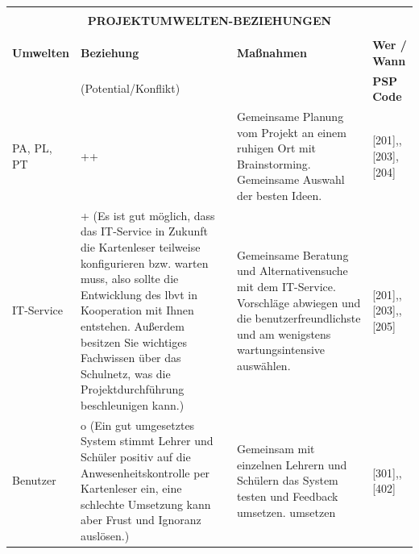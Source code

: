\begingroup
\begin{scriptsize}
\renewcommand*{\arraystretch}{1.1} %
\begin{center}
\begin{tabularx}{\textwidth}{|l|p{5.5cm}|X|p{1.8cm}|}
    \hline
    \multicolumn{4}{|c|}{\vspace{-0.005cm}\rowcolor{gray}} \\
    \multicolumn{4}{|c|}{\rowcolor{gray} \bfseries \color{white} \normalsize PROJEKTUMWELTEN-BEZIEHUNGEN \vspace{-0.05cm}} \\
    \multicolumn{4}{|c|}{\rowcolor{gray}} \\
    \hline
    \small \textbf{Umwelten} & \small \textbf{Beziehung} & \small \textbf{Maßnahmen} & \small \textbf{Wer / Wann} \\
    & \scriptsize{(Potential/Konflikt)} & & \scriptsize{\textbf{PSP Code}}\\
    \hline
    PA, PL, PT & ++ & Gemeinsame Planung vom Projekt an einem ruhigen Ort mit Brainstorming. Gemeinsame Auswahl der besten Ideen. & [201],\:[202], [203], [204]\\
    \hline
    IT-Service & + (Es ist gut möglich, dass das IT-Service in Zukunft die Kartenleser teilweise konfigurieren bzw. warten muss, also sollte die Entwicklung des \gls{lbvt} in Kooperation mit Ihnen entstehen. Außerdem besitzen Sie wichtiges Fachwissen über das Schulnetz, was die Projektdurchführung beschleunigen kann.) &
    Gemeinsame Beratung und Alternativensuche mit dem IT-Service. Vorschläge abwiegen und die benutzerfreundlichste und am wenigstens wartungsintensive auswählen. & [201],\:[202], [203],\:[204], [205] \\
    \hline
    Benutzer & o (Ein gut umgesetztes System stimmt Lehrer und Schüler positiv auf die Anwesenheitskontrolle per Kartenleser ein, eine schlechte Umsetzung kann aber Frust und Ignoranz auslösen.) & Gemeinsam mit einzelnen Lehrern und Schülern das System testen und Feedback umsetzen.
umsetzen & [301],\:[304], [402] \\
    \hline
\end{tabularx}
\end{center}
\end{scriptsize}
\endgroup

